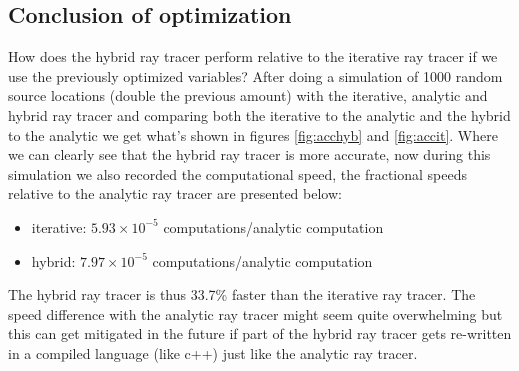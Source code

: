 \subsection{Conclusion of optimization}
How does the hybrid ray tracer perform relative to the iterative ray tracer if we use 
the previously optimized variables? After doing a simulation of 1000 random source locations (double the previous amount) with
the iterative, analytic and hybrid ray tracer and comparing both the iterative to the analytic and the hybrid to the analytic
we get what's shown in figures \ref{fig:acchyb} and \ref{fig:accit}. Where we can clearly see that the hybrid
ray tracer is more accurate, now during this simulation we also recorded the computational speed, the fractional
speeds relative to the analytic ray tracer are presented below:
\begin{itemize}
	\item iterative: $5.93 \times 10^{-5}$ computations/analytic computation
	\item hybrid: $7.97 \times 10^{-5}$ computations/analytic computation
\end{itemize}
The hybrid ray tracer is thus 33.7\% faster than the iterative ray
tracer. The speed difference with the analytic ray tracer might seem
quite overwhelming but this can get mitigated in the future if part
of the hybrid ray tracer gets re-written in a compiled language
(like c++) just like the analytic ray tracer.

